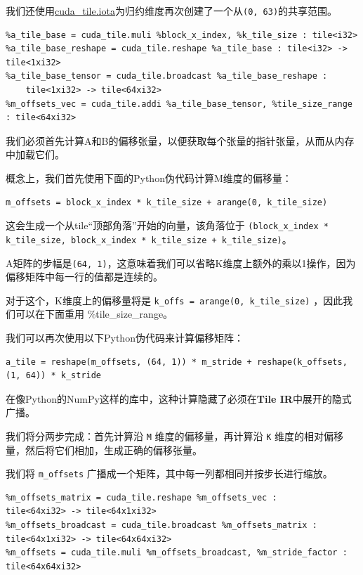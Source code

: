\documentclass{article}
\begin{document}
我们还使用\href{https://docs.nvidia.com/cuda/tile-ir/latest/sections/operations.html#op-cuda-tile-iota}{cuda\_tile.iota}为归约维度再次创建了一个从\texttt{(0, 63)}的共享范围。


\begin{lstlisting}
%a_tile_base = cuda_tile.muli %block_x_index, %k_tile_size : tile<i32>
%a_tile_base_reshape = cuda_tile.reshape %a_tile_base : tile<i32> -> tile<1xi32>
%a_tile_base_tensor = cuda_tile.broadcast %a_tile_base_reshape :
    tile<1xi32> -> tile<64xi32>
%m_offsets_vec = cuda_tile.addi %a_tile_base_tensor, %tile_size_range : tile<64xi32>
\end{lstlisting}

我们必须首先计算A和B的偏移张量，以便获取每个张量的指针张量，从而从内存中加载它们。


概念上，我们首先使用下面的Python伪代码计算M维度的偏移量：


\begin{lstlisting}
m_offsets = block_x_index * k_tile_size + arange(0, k_tile_size)
\end{lstlisting}

这会生成一个从tile``顶部角落''开始的向量，该角落位于 \texttt{(block\_x\_index * k\_tile\_size, block\_x\_index * k\_tile\_size + k\_tile\_size)}。


A矩阵的步幅是\texttt{(64, 1)}，这意味着我们可以省略K维度上额外的乘以1操作，因为偏移矩阵中每一行的值都是连续的。


对于这个，K维度上的偏移量将是 \texttt{k\_offs = arange(0, k\_tile\_size)} ，因此我们可以在下面重用 \%tile\_size\_range。


我们可以再次使用以下Python伪代码来计算偏移矩阵：


\begin{lstlisting}
a_tile = reshape(m_offsets, (64, 1)) * m_stride + reshape(k_offsets, (1, 64)) * k_stride
\end{lstlisting}

在像Python的NumPy这样的库中，这种计算隐藏了必须在\textbf{Tile IR}中展开的隐式广播。


我们将分两步完成：首先计算沿 \texttt{M} 维度的偏移量，再计算沿 \texttt{K} 维度的相对偏移量，然后将它们相加，生成正确的偏移张量。


我们将 \texttt{m\_offsets} 广播成一个矩阵，其中每一列都相同并按步长进行缩放。


\begin{lstlisting}
%m_offsets_matrix = cuda_tile.reshape %m_offsets_vec :
tile<64xi32> -> tile<64x1xi32>
%m_offsets_broadcast = cuda_tile.broadcast %m_offsets_matrix :
tile<64x1xi32> -> tile<64x64xi32>
%m_offsets = cuda_tile.muli %m_offsets_broadcast, %m_stride_factor : tile<64x64xi32>
\end{lstlisting}
\end{document}
